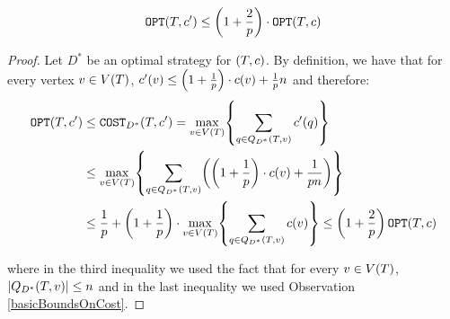 \begin{lemma}\label{rounded_dt_lemma}
    $$
    \OPT\br{T,c'}\leq \br{1+\frac{2}{p}}\cdot \OPT\br{T,c}
    $$
    \begin{proof}
        Let $D^*$ be an optimal strategy for $\br{T,c}$. By definition, we have that for every vertex $v\in V\br{T}$, $c'\br{v}\leq \br{1+\frac{1}{p}}\cdot c\br{v}+\frac{1}{p}n$ and therefore:
        \begin{align*}
            \OPT\br{T, c'}&\leq \COST_{D^*}\br{T,c'}=\max_{v\in V\br{T}}\brc{\sum_{q\in Q_{D^*}\br{T,v}}c'\br{q}}
            \\&
            \leq \max_{v\in V\br{T}}\brc{\sum_{q\in Q_{D^*}\br{T,v}}\br{\br{1+\frac{1}{p}}\cdot c\br{v}+\frac{1}{pn}}}
            \\&
            \leq \frac{1}{p}+\br{1+\frac{1}{p}}\cdot \max_{v\in V\br{T}}\brc{\sum_{q\in Q_{D^*}\br{T,v}}c\br{v} }\leq \br{1+\frac{2}{p}}\OPT\br{T,c}
        \end{align*}

        where in the third inequality we used the fact that for every $v\in V\br{T}$, $\spr{Q_{D^*}\br{T,v}}\leq n$ and in the last inequality we used Observation \ref{basicBoundsOnCost}.
    \end{proof}
\end{lemma}

